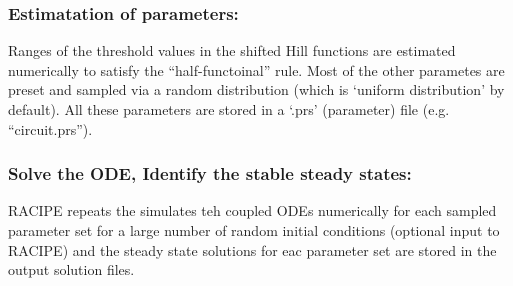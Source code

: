 \documentclass{article}
\begin{document}
\subsubsection*{Estimatation of parameters:}
Ranges of the threshold values in the shifted Hill functions are estimated 
numerically to satisfy the ``half-functoinal'' rule. Most of the other 
parametes are preset and sampled via a random distribution (which is `uniform 
distribution' by default). All these parameters are stored in a `.prs' (parameter)
file (e.g. ``circuit.prs'').

\subsubsection*{Solve the ODE, Identify the stable steady states:} RACIPE 
repeats the simulates teh coupled ODEs numerically for each sampled parameter
set for a large number of random initial conditions (optional input to RACIPE) 
and the steady state solutions for eac parameter set are stored in the output 
solution files.  
 

\end{document}
